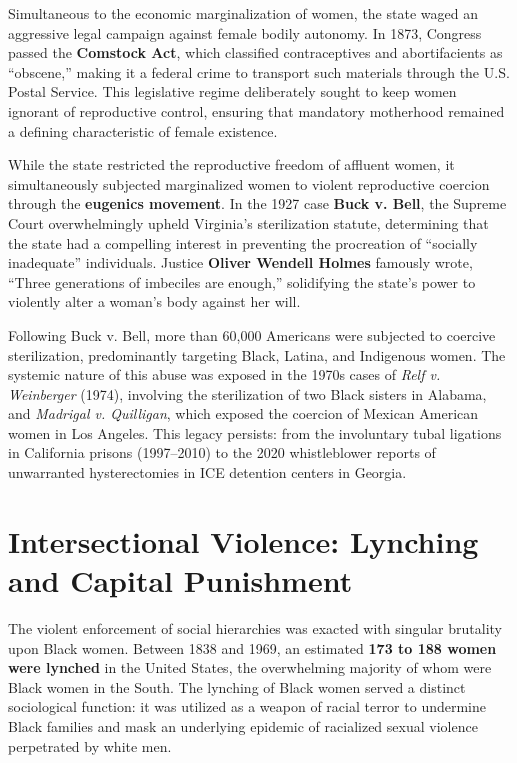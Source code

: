 \documentclass[12pt,openany]{book}
\begin{document}
Simultaneous to the economic marginalization of women, the state waged an aggressive legal campaign against female bodily autonomy. In 1873, Congress passed the \textbf{Comstock Act}, which classified contraceptives and abortifacients as ``obscene,'' making it a federal crime to transport such materials through the U.S. Postal Service. This legislative regime deliberately sought to keep women ignorant of reproductive control, ensuring that mandatory motherhood remained a defining characteristic of female existence. 

While the state restricted the reproductive freedom of affluent women, it simultaneously subjected marginalized women to violent reproductive coercion through the \textbf{eugenics movement}. In the 1927 case \textbf{Buck v. Bell}, the Supreme Court overwhelmingly upheld Virginia’s sterilization statute, determining that the state had a compelling interest in preventing the procreation of ``socially inadequate'' individuals. Justice \textbf{Oliver Wendell Holmes} famously wrote, ``Three generations of imbeciles are enough,'' solidifying the state's power to violently alter a woman's body against her will.

Following Buck v. Bell, more than 60,000 Americans were subjected to coercive sterilization, predominantly targeting Black, Latina, and Indigenous women. The systemic nature of this abuse was exposed in the 1970s cases of \textit{Relf v. Weinberger} (1974), involving the sterilization of two Black sisters in Alabama, and \textit{Madrigal v. Quilligan}, which exposed the coercion of Mexican American women in Los Angeles. This legacy persists: from the involuntary tubal ligations in California prisons (1997--2010) to the 2020 whistleblower reports of unwarranted hysterectomies in ICE detention centers in Georgia.

\section{Intersectional Violence: Lynching and Capital Punishment}

The violent enforcement of social hierarchies was exacted with singular brutality upon Black women. Between 1838 and 1969, an estimated \textbf{173 to 188 women were lynched} in the United States, the overwhelming majority of whom were Black women in the South. The lynching of Black women served a distinct sociological function: it was utilized as a weapon of racial terror to undermine Black families and mask an underlying epidemic of racialized sexual violence perpetrated by white men. 
\end{document}
